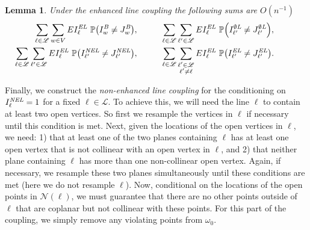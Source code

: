 \documentclass{amsart}
\newcommand{\vect}[1]{{ #1}}
\newcommand{\prob}{\mathbb{P}}
\newcommand{\B}{I^{\text{\em B}}}
\newcommand{\OL}{I^{\emptyset\text{\em L}}}
\newcommand{\EL}{I^{\text{\em EL}}}
\newcommand{\NEL}{I^{\text{\em NEL}}}
\newcommand{\JB}{J^{\text{\em B}}}
\newcommand{\JOL}{J^{\emptyset\text{\em L}}}
\newcommand{\JEL}{J^{\text{\em EL}}}
\newcommand{\JNEL}{J^{\text{\em NEL}}}
\numberwithin{equation}{section}
\newcommand{\lineset}{\mathscr{L}}
\newcommand{\Ln}{\ell}
\newtheorem{lemma}[theorem]{Lemma}
\theoremstyle{definition}
\theoremstyle{remark}
\begin{document}
\begin{lemma}
\label{el-coupling-lem}
Under the enhanced line coupling the following sums are $O(n^{-1})$
\begin{align*}
\sum_{\Ln \in \lineset} \sum_{\vect{w}\in V} E\EL_\Ln\ \prob{\left(\B_{\vect{w}} \neq \JB_{\vect{w}}\right)}, & \hspace{1cm} 
\sum_{\Ln \in \lineset} \sum_{\Ln' \in \lineset} E\EL_\Ln\ \prob{\left(\OL_{\Ln'} \neq \JOL_{\Ln'}\right)},
\hspace{1cm}  \\
\sum_{\Ln \in \lineset} \sum_{\Ln' \in \lineset} E\EL_\Ln\ \prob{\left(\NEL_{\Ln'}\neq \JNEL_{\Ln'}\right)}, &\hspace{1cm} 
\sum_{\Ln \in \lineset} \sum_{\substack{\Ln' \in \lineset\\ \Ln'\neq \Ln}} E\EL_\Ln\ \prob{\left(\EL_{\Ln'} \neq \JEL_{\Ln'}\right)} .
\end{align*}
\end{lemma}

Finally, we construct the {\em non-enhanced line coupling} for the conditioning on $\NEL_\Ln = 1$ for a fixed $\Ln \in \lineset$.  To achieve this, we will need the line $\Ln$ to contain at least two open vertices.  So first we resample the vertices in $\Ln$ if necessary until this condition is met.  Next, given the locations of the open vertices in $\Ln$, we need: 1) that at least one of the two planes containing $\Ln$ has at least one open vertex that is not collinear with an open vertex in $\Ln$, and 2) that neither plane containing $\Ln$ has more than one non-collinear open vertex.  Again, if necessary, we resample these two planes simultaneously until these conditions are met (here we do not resample $\Ln$).  Now, conditional on the locations of the open points in $\mathcal{N}(\Ln)$, we must guarantee that there are no other points outside of $\Ln$ that are coplanar but not collinear with these points.  For this part of the coupling, we simply remove any violating points from $\omega_0$.
\end{document}
